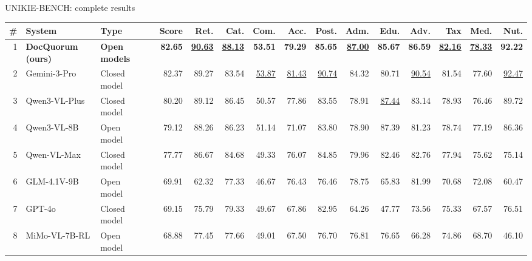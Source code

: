 \documentclass[aspectratio=169,10pt]{beamer}
\begin{document}
\begin{frame}{UNIKIE-BENCH: complete results}
\begingroup\tiny\renewcommand{\arraystretch}{1.02}\setlength{\tabcolsep}{2.6pt}
\begin{tabularx}{\textwidth}{@{}rYl@{\hspace{6pt}}lrrrrrrrrrrrr@{}}\toprule
\textbf{\#} & \textbf{System} & \textbf{Type} &  & \textbf{Score} & \textbf{Ret.} & \textbf{Cat.} & \textbf{Com.} & \textbf{Acc.} & \textbf{Post.} & \textbf{Adm.} & \textbf{Edu.} & \textbf{Adv.} & \textbf{Tax} & \textbf{Med.} & \textbf{Nut.}\\\midrule
{}1 & \textbf{DocQuorum (ours)} & {\color{good}\textbf{Open models}} & \textcolor{good}{\rule{0.99cm}{1.05ex}} & \textbf{82.65} & \textbf{\underline{90.63}} & \textbf{\underline{88.13}} & \textbf{53.51} & \textbf{79.29} & \textbf{85.65} & \textbf{\underline{87.00}} & \textbf{85.67} & \textbf{86.59} & \textbf{\underline{82.16}} & \textbf{\underline{78.33}} & \textbf{92.22}\\
2 & Gemini-3-Pro & {\color{muted}Closed model} & \textcolor{muted!45}{\rule{0.99cm}{1.05ex}} & 82.37 & 89.27 & 83.54 & \underline{53.87} & \underline{81.43} & \underline{90.74} & 84.32 & 80.71 & \underline{90.54} & 81.54 & 77.60 & \underline{92.47}\\
3 & Qwen3-VL-Plus & {\color{muted}Closed model} & \textcolor{muted!45}{\rule{0.96cm}{1.05ex}} & 80.20 & 89.12 & 86.45 & 50.57 & 77.86 & 83.55 & 78.91 & \underline{87.44} & 83.14 & 78.93 & 76.46 & 89.72\\
4 & Qwen3-VL-8B & {\color{good}Open model} & \textcolor{good!45}{\rule{0.95cm}{1.05ex}} & 79.12 & 88.26 & 86.23 & 51.14 & 71.07 & 83.80 & 78.90 & 87.39 & 81.23 & 78.74 & 77.19 & 86.36\\
5 & Qwen-VL-Max & {\color{muted}Closed model} & \textcolor{muted!45}{\rule{0.93cm}{1.05ex}} & 77.77 & 86.67 & 84.68 & 49.33 & 76.07 & 84.85 & 79.96 & 82.46 & 82.76 & 77.94 & 75.62 & 75.14\\
6 & GLM-4.1V-9B & {\color{good}Open model} & \textcolor{good!45}{\rule{0.84cm}{1.05ex}} & 69.91 & 62.32 & 77.33 & 46.67 & 76.43 & 76.46 & 78.75 & 65.83 & 81.99 & 70.68 & 72.08 & 60.47\\
7 & GPT-4o & {\color{muted}Closed model} & \textcolor{muted!45}{\rule{0.83cm}{1.05ex}} & 69.15 & 75.79 & 79.33 & 49.67 & 67.86 & 82.95 & 64.26 & 47.77 & 73.56 & 75.33 & 67.57 & 76.51\\
8 & MiMo-VL-7B-RL & {\color{good}Open model} & \textcolor{good!45}{\rule{0.83cm}{1.05ex}} & 68.88 & 77.45 & 77.66 & 49.01 & 67.50 & 76.70 & 76.81 & 76.65 & 66.28 & 74.86 & 68.70 & 46.10\\

\end{tabularx}
\end{frame}
\end{document}
